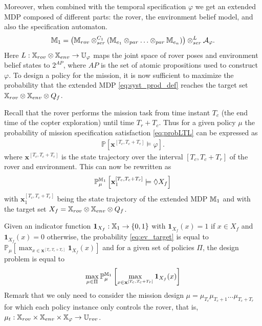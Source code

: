 \documentclass[conference]{IEEEtran}
\begin{document}
Moreover, when combined with the temporal specification $\varphi$ we get an extended MDP composed of different parts: the rover, the environment belief model, and also the specification automaton.
 \begin{equation}
\label{eq:syst_prod_def}
	\MDP_1 = \left( \MDP_{rov} \otimes_{ser}^{C_1} \left( \MDP_{e_1} \otimes_{par} \ldots \otimes_{par} \MDP_{e_n} \right) \right) \otimes_{ser}^{L} \mathcal A_{\varphi}.
\end{equation}
Here $L : \mathbb{X}_{rov} \otimes \mathbb{X}_{env} \rightarrow \mathbb{U}_{\varphi}$ maps the joint space of rover poses and environment belief states to $2^{AP}$, where $AP$ is the set of atomic propositions used to construct $\varphi$. To design a policy for the mission, it is now sufficient to maximize the probability that the extended MDP \eqref{eq:syst_prod_def} reaches the target set $\mathbb{X}_{rov} \otimes \mathbb{X}_{env} \otimes Q_f$. 

Recall that the rover performs the mission task from time instant $T_c$ (the end time of the copter exploration) until time $T_r + T_c$. Thus for a given policy $\mu$ the probability of mission specification satisfaction \eqref{eq:probLTL} can be expressed as
\begin{equation}
\begin{aligned}
\mathbb{P} \left[ \mathbf{x}^{[T_c,T_c+T_r]} \models \varphi \right].
\end{aligned}
\end{equation}
where $\mathbf{x}^{[T_c,T_c+T_r]}$ is the state trajectory over the interval $[T_c,T_c+T_r]$ of the rover and environment.
This can now be rewritten as 
\begin{equation}
  \label{eq:ev_target}
  \mathbb{P}_{\mu}^{\MDP_1} \left[ \mathbf{x}^{[T_c,T_c+T_r]}_1 \models \lozenge X_f \right]
\end{equation}
with  $\mathbf{x}^{[T_c,T_c+T_r]}_1$ being the state trajectory of the extended MDP $\mathbb{M}_1$ and with the target set $X_f=\mathbb{X}_{rov} \otimes \mathbb{X}_{env} \otimes Q_f$. 

Given an indicator function $\mathbf 1_{X_f}:\mathbb{X}_1\rightarrow\{0,1\}$ with  $\mathbf 1_{X_f}(x) = 1 $ if $x\in X_f$ and $\mathbf 1_{X_f}(x) = 0$ otherwise, the probability \eqref{eq:ev_target} is equal to \(\mathbb{P}_{\mu} \left[\max_{x\in \mathbf{x}^{[T_c,T_c+T_r]}} \mathbf 1_{X_f}(x) \right]\)
and for a given set of policies $\Pi$, the design problem is equal to 
\begin{equation}
  \label{eq:optmission}
  \max_{\mu\in \Pi}\mathbb{P}_{\mu}^{\MDP_1} \left[\max_{x\in \mathbf{x}^{[T_c,T_c+T_r]}} \mathbf 1_{X_f}(x) \right]
\end{equation}
Remark that we only need to consider the mission design $\mu=\mu_{T_c}\mu_{T_c+1}\ldots \mu_{T_c+T_r}$ for which each policy instance only controls the rover, that is, $\mu_{t}:\mathbb{X}_{rov}\times\mathbb{X}_{env}\times\mathbb{X}_\varphi\rightarrow \mathbb{U}_{rov}$.
\end{document}
